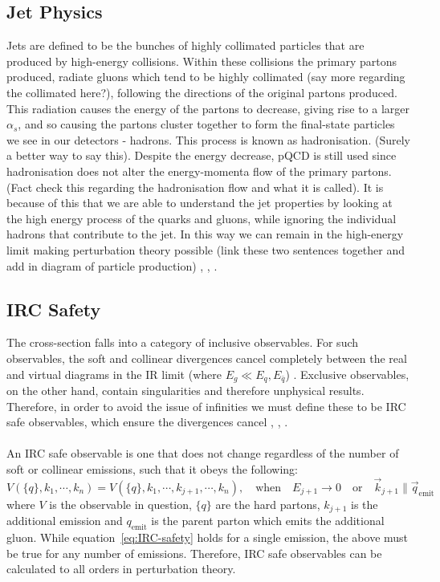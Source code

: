 \subsection{Jet Physics}
Jets are defined to be the bunches of highly collimated particles that are produced by high-energy collisions. Within these collisions the primary partons produced, radiate gluons which tend to be highly collimated {\color{blue} (say more regarding the collimated here?)}, following the directions of the original partons produced. This radiation causes the energy of the partons to decrease, giving rise to a larger $\alpha_s$, and so causing the partons cluster together to form the final-state particles we see in our detectors - hadrons. This process is known as hadronisation. {\color{blue} (Surely a better way to say this).} Despite the energy decrease, pQCD is still used since hadronisation does not alter the energy-momenta flow of the primary partons. {\color{blue} (Fact check this regarding the hadronisation flow and what it is called).} It is because of this that we are able to understand the jet properties by looking at the high energy process of the quarks and gluons, while ignoring the individual hadrons that contribute to the jet. In this way we can remain in the high-energy limit making perturbation theory possible {\color{blue} (link these two sentences together and add in diagram of particle production)} \cite{Schwartz:2014sze}, \cite{Campbell:2017hsr}, \cite{Banfi:2016yyq}. 

\subsection{IRC Safety} 
\label{sec: IRC}
The cross-section falls into a category of inclusive observables. For such observables, the soft and collinear divergences cancel completely between the real and virtual diagrams in the IR limit (where $E_g\ll E_q,E_{\bar{q}}$) \cite{Campbell:2017hsr}. Exclusive observables, on the other hand, contain singularities and therefore unphysical results. Therefore, in order to avoid the issue of infinities we must define these to be IRC safe observables, which ensure the divergences cancel \cite{Luisoni:2015xha}, \cite{McAslan:2017bqp}, \cite{Arpino:2020smn}. \\ \\
An IRC safe observable is one that does not change regardless of the number of soft or collinear emissions, such that it obeys the following:
\begin{equation}
V(\{q\},k_1,\cdots ,k_n)=V(\{q\},k_1,\cdots , k_{j+1},\cdots ,k_n),\quad \text{when}\quad E_{j+1}\rightarrow0\quad\text{or}\quad\vec{k}_{j+1}\parallel \vec{q}_{\text{emit}}
	\label{eq:IRC-safety}
\end{equation}
where $V$ is the observable in question, $\{q\}$ are the hard partons, $k_{j+1}$ is the additional emission and ${q}_{\text{emit}}$ is the parent parton which emits the additional gluon. While equation~\eqref{eq:IRC-safety} holds for a single emission, the above must be true for any number of emissions. Therefore, IRC safe observables can be calculated to all orders in perturbation theory.




